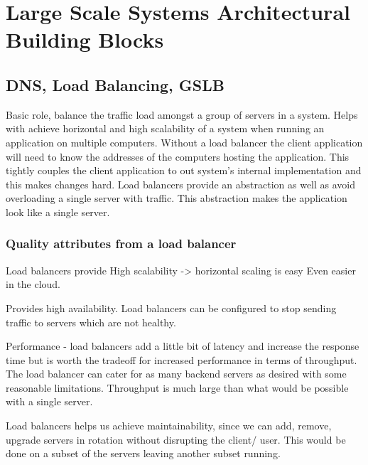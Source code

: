 \chapter{Large Scale Systems Architectural Building Blocks}

\section{DNS, Load Balancing, GSLB}
Basic role, balance the traffic load amongst a group of servers in a system.
Helps with achieve horizontal and high scalability of a system when running an application on multiple computers.
Without a load balancer the client application will need to know the addresses of the computers hosting the application.
This tightly couples the client application to out system's internal implementation and this makes changes hard.
Load balancers provide an abstraction as well as avoid overloading a single server with traffic.
This abstraction makes the application look like a single server.

\subsection{Quality attributes from a load balancer}
Load balancers provide
High scalability -> horizontal scaling is easy
Even easier in the cloud.

Provides high availability.
Load balancers can be configured to stop sending traffic to servers which are not healthy.

Performance - load balancers add a little bit of latency and increase the response time but is worth the tradeoff for increased performance in terms of throughput.
The load balancer can cater for as many backend servers as desired with some reasonable limitations.
Throughput is much large than what would be possible with a single server.

Load balancers helps us achieve maintainability, since we can add, remove, upgrade servers in rotation without disrupting the client/ user.
This would be done on a subset of the servers leaving another subset running.

